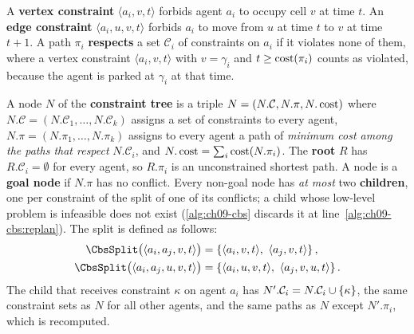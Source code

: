 \begin{definition}[Constraints]
\label{def:ch09-constraint}
A \textbf{vertex constraint} $\langle a_i, v, t\rangle$
forbids agent $a_i$ to occupy cell $v$ at time $t$. An \textbf{edge
constraint} $\langle a_i, u, v, t\rangle$ forbids
$a_i$ to move from $u$ at time $t$ to $v$ at time $t+1$. A path $\pi_i$
\textbf{respects} a set $\mathcal{C}_i$ of constraints on $a_i$ if it
violates none of them, where a vertex constraint $\langle a_i, v, t\rangle$
with $v = \gamma_i$ and $t \ge \operatorname{cost}(\pi_i)$ counts as violated, because the
agent is parked at $\gamma_i$ at that time.
\end{definition}

\begin{definition}
\label{def:ch09-ctnode}
A node $N$ of the \textbf{constraint tree} is a
triple $N = (N.\mathcal{C}, N.\pi, N.\operatorname{cost})$ where $N.\mathcal{C} =
(N.\mathcal{C}_1, \dots, N.\mathcal{C}_k)$ assigns a set of constraints to
every agent, $N.\pi = (N.\pi_1, \dots, N.\pi_k)$ assigns to every agent a
path of \emph{minimum cost among the paths that respect}
$N.\mathcal{C}_i$, and $N.\operatorname{cost} = \sum_i \operatorname{cost}(N.\pi_i)$. The \textbf{root}
$R$ has $R.\mathcal{C}_i = \emptyset$ for every agent, so $R.\pi_i$ is an
unconstrained shortest path. A node is a \textbf{goal node} if $N.\pi$ has
no conflict. Every non-goal node has \emph{at most} two
\textbf{children}, one per constraint of the split of one of its conflicts;
a child whose low-level problem is infeasible does not exist
(\cref{alg:ch09-cbs} discards it at line~\ref{alg:ch09-cbs:replan}). The
split is defined as follows:
\begin{equation}
\label{eq:ch09-split}
\begin{aligned}
\CbsSplit\bigl(\langle a_i, a_j, v, t\rangle\bigr) &= \set{\langle a_i, v, t\rangle,\ \langle a_j, v, t\rangle},\\
\CbsSplit\bigl(\langle a_i, a_j, u, v, t\rangle\bigr) &= \set{\langle a_i, u, v, t\rangle,\ \langle a_j, v, u, t\rangle}.
\end{aligned}
\end{equation}
The child that receives constraint $\kappa$ on agent $a_i$ has
$N'.\mathcal{C}_i = N.\mathcal{C}_i \cup \left\{ \kappa \right\}$, the same constraint
sets as $N$ for all other agents, and the same paths as $N$ except
$N'.\pi_i$, which is recomputed.
\end{definition}

